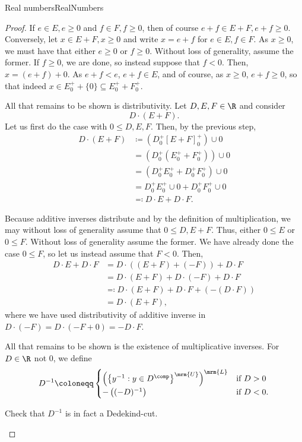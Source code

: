 \begin{thm}{Real numbers}{RealNumbers}
\begin{proof}
If $e\in E,e\geq 0$ and $f\in F,f\geq 0$, then of course $e+f\in E+F,e+f\geq 0$.  Conversely, let $x\in E+F,x\geq 0$ and write $x=e+f$ for $e\in E,f\in F$.  As $x\geq 0$, we must have that either $e\geq 0$ or $f\geq 0$.  Without loss of generality, assume the former.  If $f\geq 0$, we are done, so instead suppose that $f<0$.  Then, $x=(e+f)+0$.  As $e+f<e$, $e+f\in E$, and of course, as $x\geq 0$, $e+f\geq 0$, so that indeed $x\in E_0^++\{ 0\} \subseteq E_0^++F_0^+$.

All that remains to be shown is distributivity.  Let $D,E,F\in \R$ and consider
\begin{equation}
D\cdot (E+F).
\end{equation}
Let us first do the case with $0\leq D,E,F$.  Then, by the previous step,
\begin{equation}
\begin{split}
D\cdot (E+F) & \coloneqq \left( D_0^+[E+F]_0^+\right) \cup 0 \\
& =\left( D_0^+(E_0^++F_0^+)\right) \cup 0 \\
& =\left( D_0^+E_0^++D_0^+F_0^+\right) \cup 0 \\
& =D_0^+E_0^+\cup 0+D_0^+F_0^+\cup 0 \\
& \eqqcolon D\cdot E+D\cdot F.
\end{split}
\end{equation}

Because additive inverses distribute and by the definition of multiplication, we may without loss of generality assume that $0\leq D,E+F$.  Thus, either $0\leq E$ or $0\leq F$.  Without loss of generality assume the former.  We have already done the case $0\leq F$, so let us instead assume that $F<0$.  Then,
\begin{equation}
\begin{split}
D\cdot E+D\cdot F & =D\cdot \left( (E+F)+(-F)\right) +D\cdot F \\
& =D\cdot (E+F)+D\cdot (-F)+D\cdot F \\
& \eqqcolon D\cdot (E+F)+D\cdot F+\left( -(D\cdot F)\right) \\
& =D\cdot (E+F),
\end{split}
\end{equation}
where we have used distributivity of additive inverse in $D\cdot (-F)=D\cdot (-F+0)=-D\cdot F$.

All that remains to be shown is the existence of multiplicative inverses.  For $D\in \R$ not $0$, we define
\begin{equation}
D^{-1}\coloneqq \begin{cases}\left( \left\{ y^{-1}:y\in D^{\comp}\right\} ^{\mrm{U}}\right) ^{\mrm{L}}& \text{if }D>0 \\ -\left( (-D)^{-1}\right) & \text{if }D<0.\end{cases}
\end{equation}
\begin{exr}[breakable=false]{}{}
Check that $D^{-1}$ is in fact a Dedekind-cut.
\end{exr}


\end{proof}
\end{thm}
